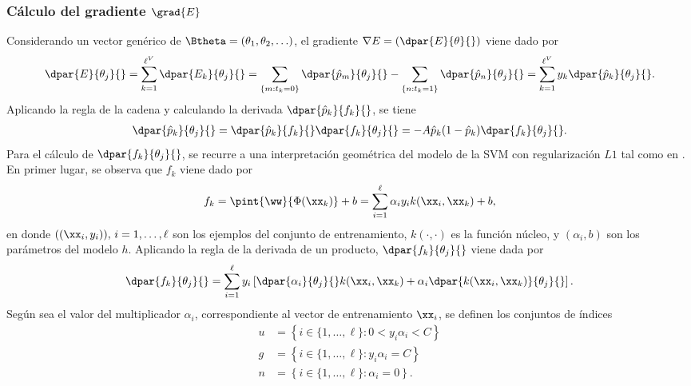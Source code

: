 %
\subsubsection{Cálculo del gradiente $\grad{E}$}
\label{se:gradE}
%
Considerando un vector genérico de 
$\Btheta=(\theta_1,\theta_2,\ldots)$, el gradiente
$\nabla{}E=\left(\dpar{E}{\theta}{}\right)$ viene dado por
%
\begin{align}
\label{gradE}
  \dpar{E}{\theta_j}{} = \sum_{k=1}^{\ell^V} \dpar{E_k}{\theta_j}{} =
  \sum_{ \{m:t_k=0\}  } \dpar{\hat{p}_m}{\theta_j}{}
  - \sum_{ \{n:t_k=1\}  } \dpar{\hat{p}_n}{\theta_j}{}
  = \sum_{k=1}^{\ell^V} y_k \dpar{\hat{p}_k}{\theta_j}{}.
\end{align}
%
Aplicando la regla de la cadena y calculando la derivada
$\dpar{\hat{p}_k}{f_k}{}$, se tiene
%
\begin{align}
  \dpar{\hat{p}_k}{\theta_j}{} =
  \dpar{\hat{p}_k}{f_k}{}\dpar{f_k}{\theta_j}{} =
  -A\hat{p}_k(1-\hat{p}_k)\dpar{f_k}{\theta_j}{}.
  \label{eq:deriv-pk-thetaj}
\end{align}
%
Para el cálculo de $\dpar{f_k}{\theta_j}{}$, se recurre a una
interpretación geométrica del modelo de la SVM con regularización $L1$
tal como en \cite{keerthi,glasmachers,shark}.
En primer lugar, se observa que $f_k$ viene dado por
%
\begin{align}
  f_k = \pint{\ww}{\Phi(\xx_k)}+b
      = \sum_{i=1}^\ell \alpha_i y_i k(\xx_i,\xx_k) + b,
  \label{fk}
\end{align}
%
en donde $((\xx_i,y_i)),\,i=1,\ldots,\ell$ son los ejemplos del
conjunto de entrenamiento, $k(\cdot,\cdot)$ es la función núcleo, y
$(\alpha_i, b)$ son los parámetros del modelo $h$.
Aplicando la regla de la derivada de un producto,
$\dpar{f_k}{\theta_j}{}$ viene dada por
\begin{align}
  \dpar{f_k}{\theta_j}{} = \sum_{i=1}^\ell y_i
  \left[\dpar{\alpha_i}{\theta_j}{} k(\xx_i,\xx_k) + \alpha_i
    \dpar{k(\xx_i,\xx_k)}{\theta_j}{} \right].
\end{align}
%
Según sea el valor del multiplicador $\alpha_i$, correspondiente al
vector de entrenamiento $\xx_i$, se definen los conjuntos de índices
%
\begin{align}
  \label{unbounded-sv-set}
  u &= \left\{i\in\{1,\ldots,\ell\}:0<y_i\alpha_i<C \right\}\\
  \label{bounded-sv-set}
  g &= \left\{i\in\{1,\ldots,\ell\}: y_i\alpha_i=C \right\}\\
  n &= \left\{i\in\{1,\ldots,\ell\}: \alpha_i=0 \right\}.
\end{align}
